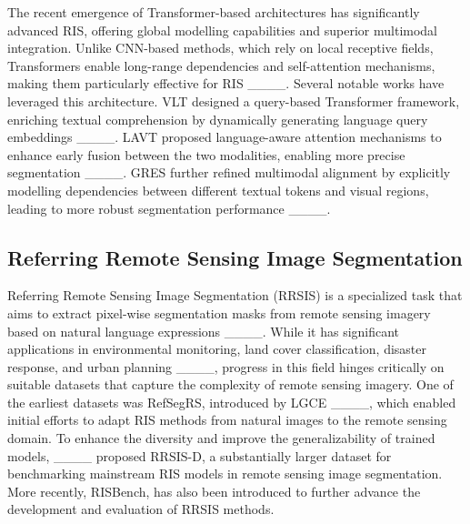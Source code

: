 The recent emergence of Transformer-based architectures has significantly advanced RIS, offering global modelling capabilities and superior multimodal integration. Unlike CNN-based methods, which rely on local receptive fields, Transformers enable long-range dependencies and self-attention mechanisms, making them particularly effective for RIS ____. Several notable works have leveraged this architecture. VLT designed a query-based Transformer framework, enriching textual comprehension by dynamically generating language query embeddings ____. LAVT proposed language-aware attention mechanisms to enhance early fusion between the two modalities, enabling more precise segmentation ____. GRES further refined multimodal alignment by explicitly modelling dependencies between different textual tokens and visual regions, leading to more robust segmentation performance ____.

\subsection{ Referring Remote Sensing Image Segmentation}
\label{sec:2.2}
Referring Remote Sensing Image Segmentation (RRSIS) is a specialized task that aims to extract pixel-wise segmentation masks from remote sensing imagery based on natural language expressions ____. While it has significant applications in environmental monitoring, land cover classification, disaster response, and urban planning ____, progress in this field hinges critically on suitable datasets that capture the complexity of remote sensing imagery. One of the earliest datasets was RefSegRS, introduced by LGCE ____, which enabled initial efforts to adapt RIS methods from natural images to the remote sensing domain. To enhance the diversity and improve the generalizability of trained models, ____ proposed RRSIS-D, a substantially larger dataset for benchmarking mainstream RIS models in remote sensing image segmentation. More recently, RISBench, has also been introduced to further advance the development and evaluation of RRSIS methods. 

